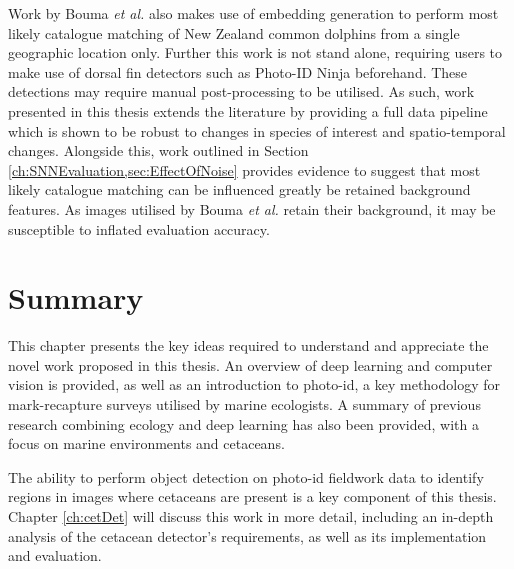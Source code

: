 Work by Bouma \textit{et al.} \cite{bouma_individual_2018} also makes use of embedding generation to perform most likely catalogue matching of New Zealand common dolphins from a single geographic location only. Further this work is not stand alone, requiring users to make use of dorsal fin detectors such as Photo-ID Ninja beforehand. These detections may require manual post-processing to be utilised. As such, work presented in this thesis extends the literature by providing a full data pipeline which is shown to be robust to changes in species of interest and spatio-temporal changes. Alongside this, work outlined in Section \ref{ch:SNNEvaluation,sec:EffectOfNoise} provides evidence to suggest that most likely catalogue matching can be influenced greatly be retained background features. As images utilised by Bouma \textit{et al.} retain their background, it may be susceptible to inflated evaluation accuracy. 

\section{Summary}\label{ch:Background,sec:Summary}

This chapter presents the key ideas required to understand and appreciate the novel work proposed in this thesis. An overview of deep learning and computer vision is provided, as well as an introduction to photo-id, a key methodology for mark-recapture surveys utilised by marine ecologists. A summary of previous research combining ecology and deep learning has also been provided, with a focus on marine environments and cetaceans. 

The ability to perform object detection on photo-id fieldwork data to identify regions in images where cetaceans are present is a key component of this thesis. Chapter \ref{ch:cetDet} will discuss this work in more detail, including an in-depth analysis of the cetacean detector's requirements, as well as its implementation and evaluation.


